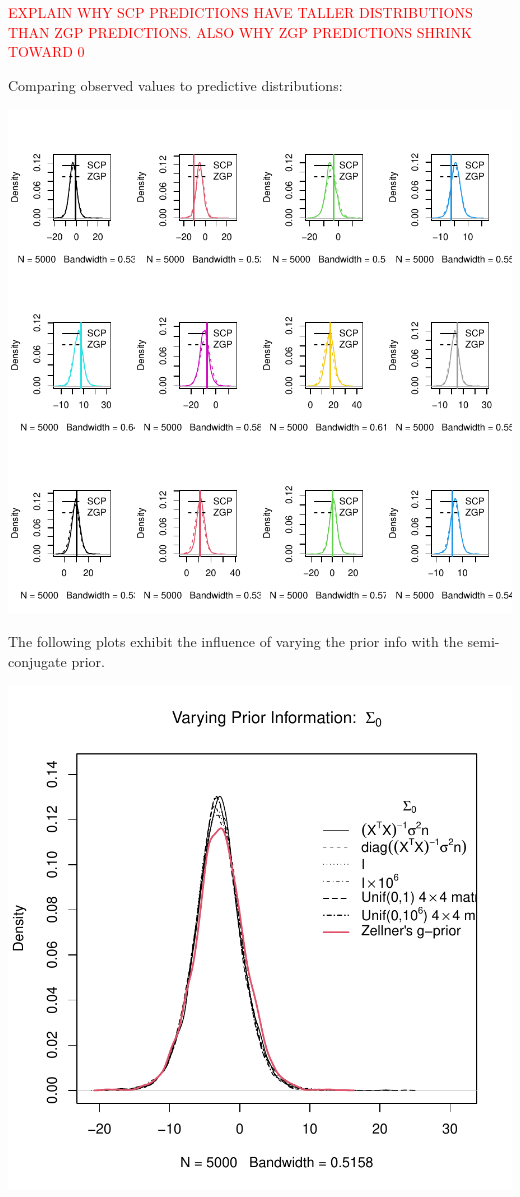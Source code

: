 \documentclass[12pt, a4paper]{article}
\begin{document}
\textcolor{red}{EXPLAIN WHY SCP PREDICTIONS HAVE TALLER DISTRIBUTIONS THAN ZGP PREDICTIONS.  ALSO WHY ZGP PREDICTIONS SHRINK TOWARD 0}

\clearpage

Comparing observed values to predictive distributions:

\includegraphics{Thesis_v1-021}





The following plots exhibit the influence of varying the prior info with the semi-conjugate prior.

\includegraphics{Thesis_v1-022}
\end{document}
